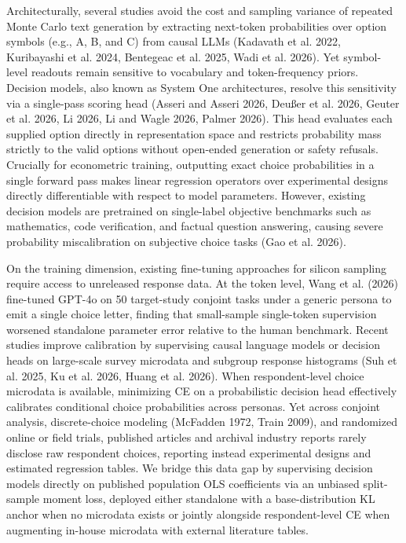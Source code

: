 \documentclass[
  11pt,
  letterpaper,
]{article}
\begin{document}
Architecturally, several studies avoid the cost and sampling variance of
repeated Monte Carlo text generation by extracting next-token
probabilities over option symbols (e.g., A, B, and C) from causal LLMs
({Kadavath et al.} 2022, Kuribayashi et al. 2024, Bentegeac et al. 2025,
Wadi et al. 2026). Yet symbol-level readouts remain sensitive to
vocabulary and token-frequency priors. Decision models, also known as
System One architectures, resolve this sensitivity via a single-pass
scoring head (Asseri and Asseri 2026, Deußer et al. 2026, Geuter et al.
2026, Li 2026, Li and Wagle 2026, Palmer 2026). This head evaluates each
supplied option directly in representation space and restricts
probability mass strictly to the valid options without open-ended
generation or safety refusals. Crucially for econometric training,
outputting exact choice probabilities in a single forward pass makes
linear regression operators over experimental designs directly
differentiable with respect to model parameters. However, existing
decision models are pretrained on single-label objective benchmarks such
as mathematics, code verification, and factual question answering,
causing severe probability miscalibration on subjective choice tasks
(Gao et al. 2026).

On the training dimension, existing fine-tuning approaches for silicon
sampling require access to unreleased response data. At the token level,
Wang et al. (2026) fine-tuned GPT-4o on 50 target-study conjoint tasks
under a generic persona to emit a single choice letter, finding that
small-sample single-token supervision worsened standalone parameter
error relative to the human benchmark. Recent studies improve
calibration by supervising causal language models or decision heads on
large-scale survey microdata and subgroup response histograms (Suh et
al. 2025, Ku et al. 2026, Huang et al. 2026). When respondent-level
choice microdata is available, minimizing CE on a probabilistic decision
head effectively calibrates conditional choice probabilities across
personas. Yet across conjoint analysis, discrete-choice modeling
(McFadden 1972, Train 2009), and randomized online or field trials,
published articles and archival industry reports rarely disclose raw
respondent choices, reporting instead experimental designs and estimated
regression tables. We bridge this data gap by supervising decision
models directly on published population OLS coefficients via an unbiased
split-sample moment loss, deployed either standalone with a
base-distribution KL anchor when no microdata exists or jointly
alongside respondent-level CE when augmenting in-house microdata with
external literature tables.
\end{document}
